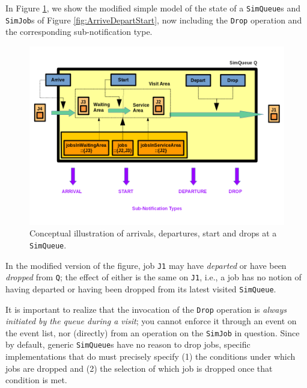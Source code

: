 In Figure \ref{fig:ArriveDepartStartDrop},
  we show the modified simple model of the state of
  a \lstinline|SimQueue|s
  and \lstinline|SimJob|s of Figure \ref{fig:ArriveDepartStart},
  now including the \lstinline|Drop| operation
  and the corresponding sub-notification type.

\begin{figure}[!htbp]
\label{fig:ArriveDepartStartDrop}
\caption{Conceptual illustration
         of arrivals, departures, start and drops
         at a \texttt{SimQueue}.}
\includegraphics[width=\textwidth]{fig/ArriveDepartStartDrop}
\end{figure}

In the modified version of the figure,
  job \lstinline|J1| may have {\em departed\/}
  or have been {\em dropped\/} from \lstinline|Q|;
  the effect of either is the same on \lstinline|J1|,
  i.e., a job has no notion
  of having departed or having been dropped from its
  latest visited \lstinline|SimQueue|.
  
It is important to realize that the invocation
  of the \lstinline|Drop| operation
  is {\em always initiated by the queue during a visit\/};
  you cannot enforce it through an event on the event list,
  nor (directly) from an operation
  on the \lstinline|SimJob| in question.
Since by default,
  generic \lstinline|SimQueue|s
  have no reason to drop jobs,
  specific implementations that do
  must precisely specify
  (1) the conditions under which
  jobs are dropped
  and (2) the selection of which job is dropped
  once that condition is met.

